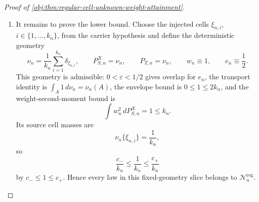 \documentclass[11pt]{article}
\begin{document}
\begin{proof}[Proof of \cref{obj:thm:regular-cell-unknown-weight-attainment}]
\begin{enumerate}
\item It remains to prove the lower bound. Choose the injected cells \(\xi_{n,i}\), \(i\in\{1,\ldots,k_n\}\), from the carrier hypothesis and define the deterministic geometry
\[
\nu_n=\frac1{k_n}\sum_{i=1}^{k_n}\delta_{\xi_{n,i}},
\qquad
P_{S,n}^X=\nu_n,
\qquad
P_{T,n}=\nu_n,
\qquad
w_n\equiv1,
\qquad
e_n\equiv\frac12 .
\]
This geometry is admissible: \(0<\varepsilon<1/2\) gives overlap for \(e_n\), the transport identity is \(\int_A1\,d\nu_n=\nu_n(A)\), the envelope bound is \(0\le1\le2k_n\), and the weight-second-moment bound is
\[
\int w_n^2\,dP_{S,n}^X=1\le k_n.
\]
Its source cell masses are
\[
\nu_n\{\xi_{n,i}\}=\frac1{k_n},
\]
so
\[
\frac{c_-}{k_n}\le \frac1{k_n}\le \frac{c_+}{k_n}
\]
by \(c_-\le1\le c_+\). Hence every law in this fixed-geometry slice belongs to \(\mathcal N_n^{\mathrm{reg}}\).


\end{enumerate}
\end{proof}
\end{document}
